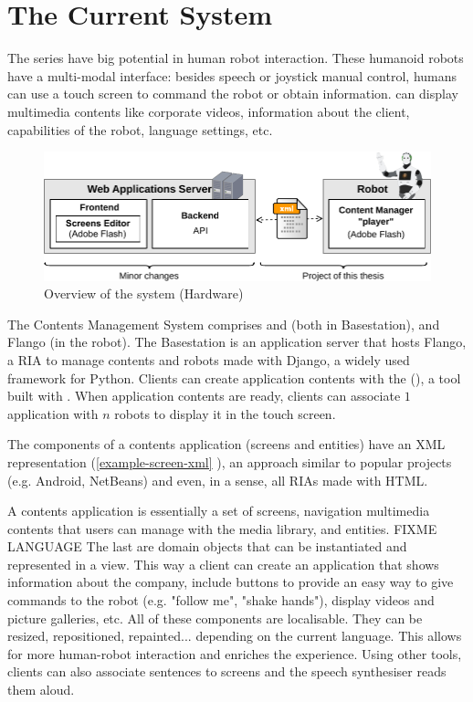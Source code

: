 \section{The Current System}
The \reem{} series have big potential in human robot interaction. 
These humanoid robots have a multi-modal interface: besides speech or joystick manual control, humans can use a touch screen to command the robot or obtain information.
\reem{} can display multimedia contents like corporate videos, information about the client, capabilities of the robot, language settings, etc.

\begin{figure}[htb]
    \label{fig:intro-system-overview}
    \centering
    \includegraphics[width=14cm]{figures/intro-system-overview}
    \caption{Overview of the system (Hardware)}
\end{figure}

The Contents Management System comprises \flangofe and \flangobe (both in Basestation), and Flango \cm (in the robot).
The Basestation is an application server that hosts Flango, a \ac{RIA} to manage contents and robots made with Django, a widely used framework for Python. 
Clients can create application contents with the \flangofe (\se), a tool built with \flash .
When application contents are ready, clients can associate $1$ application with $n$ robots to display it in the touch screen.



The components of a contents application (screens and entities) have an \ac{XML} representation (\ref{example-screen-xml} ), an approach similar to popular projects (e.g. Android, NetBeans) and even, in a sense, all \acp{RIA} made with \ac{HTML}.

A contents application is essentially a set of screens, navigation multimedia contents that users can manage with the media library, and entities. 
FIXME LANGUAGE The last are domain objects that can be instantiated and represented in a view. 
This way a client can create an application that shows information about the company, include buttons to provide an easy way to give commands to the robot (e.g. "follow me", "shake hands"), display videos and picture galleries, etc.
All of these components are localisable. 
They can be resized, repositioned, repainted... depending on the current language.
This allows for more human-robot interaction and enriches the experience. 
Using other tools, clients can also associate sentences to screens and the speech synthesiser reads them aloud.

